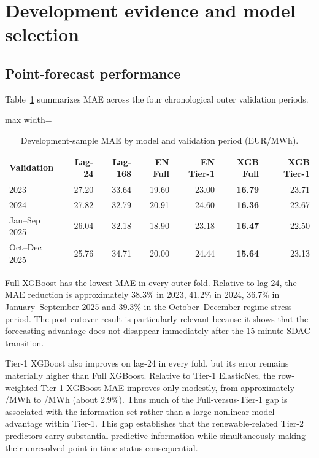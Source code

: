 \section{Development evidence and model selection}
\label{sec:development}

\subsection{Point-forecast performance}

Table~\ref{tab:dev_mae} summarizes MAE across the four chronological outer validation periods.

\begin{table}[htbp]
\centering
\caption{Development-sample MAE by model and validation period (EUR/MWh).}
\label{tab:dev_mae}
\begin{adjustbox}{max width=\textwidth}
\begin{tabular}{lrrrrrr}
\toprule
Validation & Lag-24 & Lag-168 & EN Full & EN Tier-1 & XGB Full & XGB Tier-1 \\
\midrule
2023 & 27.20 & 33.64 & 19.60 & 23.00 & \textbf{16.79} & 23.71 \\
2024 & 27.82 & 32.79 & 20.91 & 24.60 & \textbf{16.36} & 22.67 \\
Jan--Sep 2025 & 26.04 & 32.18 & 18.90 & 23.18 & \textbf{16.47} & 22.50 \\
Oct--Dec 2025 & 25.76 & 34.71 & 20.00 & 24.44 & \textbf{15.64} & 23.13 \\
\bottomrule
\end{tabular}
\end{adjustbox}
\end{table}

Full XGBoost has the lowest MAE in every outer fold. Relative to lag-24, the MAE reduction is approximately 38.3\% in 2023, 41.2\% in 2024, 36.7\% in January--September 2025 and 39.3\% in the October--December regime-stress period. The post-cutover result is particularly relevant because it shows that the forecasting advantage does not disappear immediately after the 15-minute SDAC transition.

Tier-1 XGBoost also improves on lag-24 in every fold, but its error remains materially higher than Full XGBoost. Relative to Tier-1 ElasticNet, the row-weighted Tier-1 XGBoost MAE improves only modestly, from approximately /MWh to /MWh (about 2.9\%). Thus much of the Full-versus-Tier-1 gap is associated with the information set rather than a large nonlinear-model advantage within Tier-1. This gap establishes that the renewable-related Tier-2 predictors carry substantial predictive information while simultaneously making their unresolved point-in-time status consequential.

